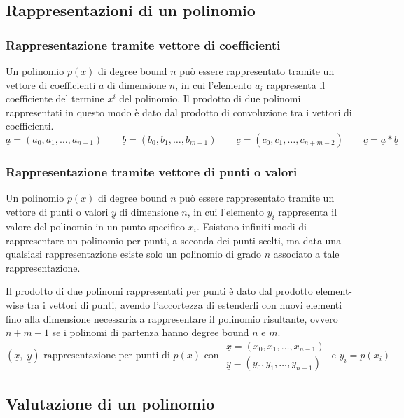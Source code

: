 \subsection{Rappresentazioni di un polinomio}
\subsubsection*{Rappresentazione tramite vettore di coefficienti}
Un polinomio \(p(x)\) di degree bound \(n\) può essere rappresentato tramite un vettore di coefficienti \(\underline{a}\)
di dimensione \(n\), in cui l'elemento \(a_i\) rappresenta il coefficiente del termine \(x^i\) del polinomio. Il prodotto
di due polinomi rappresentati in questo modo è dato dal prodotto di convoluzione tra i vettori di coefficienti.
\[\underline{a} = (a_0, a_1, \dotsc, a_{n-1}) \qquad \underline{b} = (b_0, b_1, \dotsc, b_{m-1}) \qquad \underline{c} = (c_0, c_1, \dotsc, c_{n+m-2})\qquad \underline{c} = \underline{a} * \underline{b}\]

\subsubsection*{Rappresentazione tramite vettore di punti o valori}
Un polinomio \(p(x)\) di degree bound \(n\) può essere rappresentato tramite un vettore di punti o valori \(\underline{y}\)
di dimensione \(n\), in cui l'elemento \(y_i\) rappresenta il valore del polinomio in un punto specifico \(x_i\). Esistono
infiniti modi di rappresentare un polinomio per punti, a seconda dei punti scelti, ma data una qualsiasi rappresentazione
esiste solo un polinomio di grado \(n\) associato a tale rappresentazione.

Il prodotto di due polinomi rappresentati per punti è dato dal prodotto element-wise tra i vettori di punti, avendo
l'accortezza di estenderli con nuovi elementi fino alla dimensione necessaria a rappresentare il polinomio risultante,
ovvero \(n + m - 1\) se i polinomi di partenza hanno degree bound \(n\) e \(m\).
\[(\underline{x}, \; \underline{y}) \text{ rappresentazione per punti di } p(x) \text{ con } \begin{array}{c}
	\underline{x} = (x_0, x_1, \dotsc, x_{n-1}) \\ \underline{y} = (y_0, y_1, \dotsc, y_{n-1})
\end{array} \text{ e } y_i = p(x_i)\]

\newpage

\subsection{Valutazione di un polinomio}
